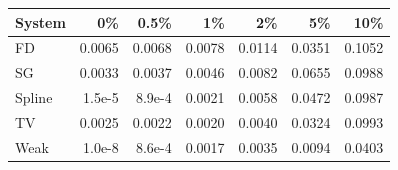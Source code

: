 \begin{tabular}{lrrrrrr}\toprule
System & 0\% & 0.5\% & 1\% & 2\% & 5\% & 10\% \\\midrule
FD & 0.0065 & 0.0068 & 0.0078 & 0.0114 & 0.0351 & 0.1052 \\
SG & 0.0033 & 0.0037 & 0.0046 & 0.0082 & 0.0655 & 0.0988 \\
Spline & 1.5e-5 & 8.9e-4 & 0.0021 & 0.0058 & 0.0472 & 0.0987 \\
TV & 0.0025 & 0.0022 & 0.0020 & 0.0040 & 0.0324 & 0.0993 \\
Weak & 1.0e-8 & 8.6e-4 & 0.0017 & 0.0035 & 0.0094 & 0.0403 \\
\bottomrule\end{tabular}
